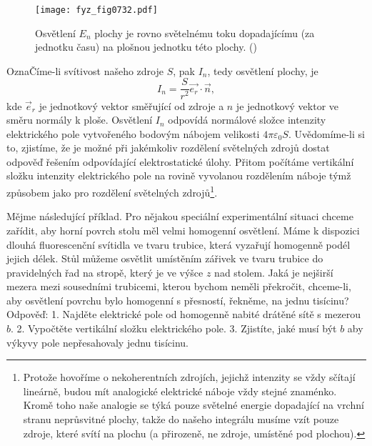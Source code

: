     \begin{figure}[ht!] %
      \centering
      \texttt{[image: fyz\_fig0732.pdf]}
      \caption{Osvětlení \(E_n\) plochy je rovno světelnému toku dopadajícímu (za jednotku času) na
        plošnou jednotku této plochy. (\cite[s.~220]{Feynman02})}
      \label{fyz:fig0732}
    \end{figure}

    OznaČíme-li svítivost našeho zdroje \(S\), pak \(I_n\), tedy osvětlení plochy, je
    \begin{equation*}
      I_n=\dfrac{S}{r^2}\vec{e_r}⋅\vec{n},
    \end{equation*}
    kde \(\vec{e}_r\) je jednotkový vektor směřující od zdroje a \(n\) je jednotkový vektor ve směru
    normály k ploše. Osvětlení \(I_n\) odpovídá normálové složce intenzity elektrického pole
    vytvořeného bodovým nábojem velikosti \(4π\varepsilon_0S\). Uvědomíme-li si to, zjistíme, že je možné při
    jakémkoliv rozdělení světelných zdrojů dostat odpověď řešením odpovídající elektrostatické
    úlohy. Přitom počítáme vertikální složku intenzity elektrického pole na rovině vyvolanou
    rozdělením náboje týmž způsobem jako pro rozdělení světelných zdrojů\footnote{Protože hovoříme o
    nekoherentních zdrojích, jejichž intenzity se vždy sčítají lineárně, budou mít analogické
    elektrické náboje vždy stejné znaménko. Kromě toho naše analogie se týká pouze světelné energie
    dopadající na vrchní stranu neprůsvitné plochy, takže do našeho integrálu musíme vzít pouze
    zdroje, které svítí na plochu (a přirozeně, ne zdroje, umístěné pod plochou).}.

    Mějme následující příklad. Pro nějakou speciální experimentální situaci chceme zařídit, aby
    horní povrch stolu měl velmi homogenní osvětlení. Máme k dispozici dlouhá fluorescenční svítidla
    ve tvaru trubice, která vyzařují homogenně podél jejich délek. Stůl můžeme osvětlit umístěním
    zářivek ve tvaru trubice do pravidelných řad na stropě, který je ve výšce \(z\) nad stolem. Jaká
    je nejširší mezera mezi sousedními trubicemi, kterou bychom neměli překročit, chceme-li, aby
    osvětlení povrchu bylo homogenní s přesností, řekněme, na jednu tisícinu? Odpověď: 1. Najděte
    elektrické pole od homogenně nabité drátěné sítě s mezerou \(b\). 2. Vypočtěte vertikální složku
    elektrického pole. 3. Zjistíte, jaké musí být \(b\) aby výkyvy pole nepřesahovaly jednu
    tisícinu.

